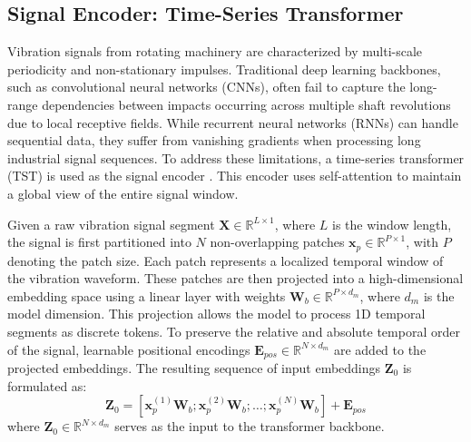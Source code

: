 \documentclass[journal]{IEEEtran}
\begin{document}
\subsection{Signal Encoder: Time-Series Transformer}

Vibration signals from rotating machinery are characterized by multi-scale periodicity and non-stationary impulses. Traditional deep learning backbones, such as convolutional neural networks (CNNs), often fail to capture the long-range dependencies between impacts occurring across multiple shaft revolutions due to local receptive fields. While recurrent neural networks (RNNs) can handle sequential data, they suffer from vanishing gradients when processing long industrial signal sequences. To address these limitations, a time-series transformer (TST) is used as the signal encoder \cite{zerveas2021transformer}. This encoder uses self-attention to maintain a global view of the entire signal window.

Given a raw vibration signal segment $\mathbf{X} \in \mathbb{R}^{L \times 1}$, where $L$ is the window length, the signal is first partitioned into $N$ non-overlapping patches $\mathbf{x}_p \in \mathbb{R}^{P \times 1}$, with $P$ denoting the patch size. Each patch represents a localized temporal window of the vibration waveform. These patches are then projected into a high-dimensional embedding space using a linear layer with weights $\mathbf{W}_b \in \mathbb{R}^{P \times d_m}$, where $d_m$ is the model dimension. This projection allows the model to process 1D temporal segments as discrete tokens. To preserve the relative and absolute temporal order of the signal, learnable positional encodings $\mathbf{E}_{pos} \in \mathbb{R}^{N \times d_m}$ are added to the projected embeddings. The resulting sequence of input embeddings $\mathbf{Z}_0$ is formulated as:
\begin{equation}
\mathbf{Z}_0 = [\mathbf{x}_p^{(1)}\mathbf{W}_b; \mathbf{x}_p^{(2)}\mathbf{W}_b; \dots; \mathbf{x}_p^{(N)}\mathbf{W}_b] + \mathbf{E}_{pos}
\end{equation}
where $\mathbf{Z}_0 \in \mathbb{R}^{N \times d_m}$ serves as the input to the transformer backbone.
\end{document}
